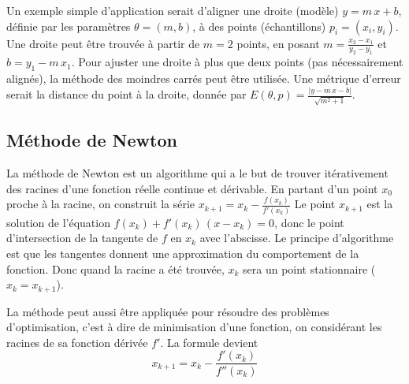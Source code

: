 \documentclass[a4paper,10pt]{scrreprt}
\begin{document}
Un exemple simple d'application serait d'aligner une droite (modèle) $y = m \, x + b$, définie par les paramètres $\theta = (m,b)$, à des points (échantillons) $p_i = (x_i,y_i)$. Une droite peut être trouvée à partir de $m = 2$ points, en posant $m = \frac{x_2 - x_1}{y_2 - y_1}$ et $b = y_1 - m \, x_1$. Pour ajuster une droite à plus que deux points (pas nécessairement alignés), la méthode des moindres carrés peut être utilisée. Une métrique d'erreur serait la distance du point à la droite, donnée par $E(\theta, p) = \frac{|y - m\,x - b|}{\sqrt{m^2 + 1}}$.

\subsection{Méthode de Newton} \label{sec:newton}
La méthode de Newton est un algorithme qui a le but de trouver itérativement des racines d'une fonction réelle continue et dérivable. En partant d'un point $x_0$ proche à la racine, on construit la série $x_{k+1} = x_{k} - \frac{f(x_k)}{f'(x_k)}$ Le point $x_{k+1}$ est la solution de l'équation $f(x_k) + f'(x_k) \, (x - x_k) = 0$, donc le point d'intersection de la tangente de $f$ en $x_k$ avec l'abscisse. Le principe d'algorithme est que les tangentes donnent une approximation du comportement de la fonction. Donc quand la racine a été trouvée, $x_k$ sera un point stationnaire ($x_k = x_{k+1}$).

La méthode peut aussi être appliquée pour résoudre des problèmes d'optimisation, c'est à dire de minimisation d'une fonction, on considérant les racines de sa fonction dérivée $f'$. La formule devient
\begin{equation}
	x_{k+1} = x_{k} - \frac{f'(x_k)}{f''(x_k)}
\end{equation}
\end{document}
